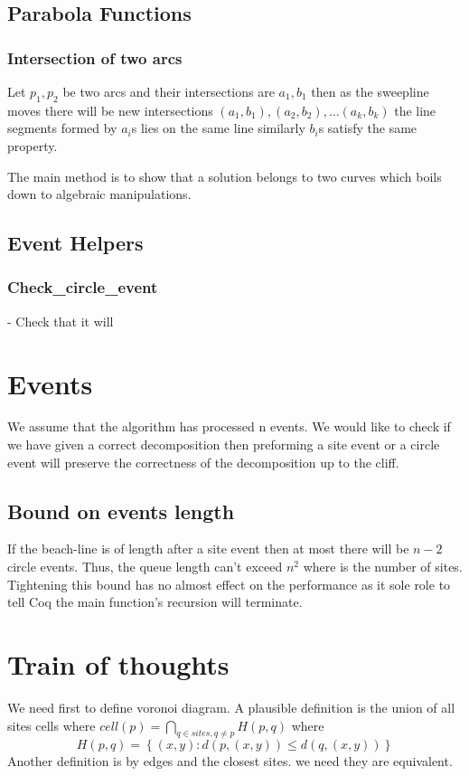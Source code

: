 \documentclass{article}
\begin{document}
\subsection{Parabola Functions}
\subsubsection{Intersection of two arcs}
Let $p_1, p_2$ be two arcs and their intersections are $a_1, b_1$ then as the sweepline moves there will be new intersections $\left(a_1, b_1\right),\left(a_2, b_2\right),\dots \left(a_k, b_k\right)$ the line segments formed by $a_i$s lies on the same line similarly  $b_i$s satisfy the same property.

The main method is to show that a solution belongs to two curves which boils down to algebraic manipulations.

\subsection{Event Helpers}
\subsubsection{Check\_circle\_event}
- Check that it will 

\section{Events}
We assume that the algorithm has processed n events. We would like to check if we have given a correct decomposition then preforming a site event or a circle event will preserve the correctness of the decomposition up to the cliff.

\subsection{Bound on events length} If the beach-line is of length after a site event then at most there will be $n-2$ circle events. Thus, the queue length can't exceed $n^2$ where is the number of sites. Tightening this bound has no almost effect on the performance as it sole role to tell Coq the main function's recursion will terminate.

\section{Train of thoughts}
We need first to define voronoi diagram. A plausible definition is the union of all sites cells where $cell(p)= \bigcap_{q \in sites, q\not = p} H(p, q) $ where 
$$H(p, q) = \left\{(x,y) : d\left(p,(x, y) \right) \leq  d\left(q,(x, y) \right) \right\}$$ 
Another definition is by edges and the closest sites. we need they are equivalent.
\end{document}
